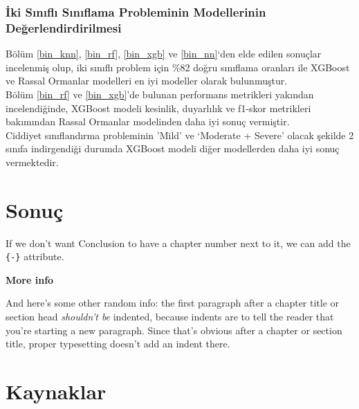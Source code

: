 \documentclass[12pt,twoside]{deuthesis}
\begin{document}
\hypertarget{iki-sux131nux131flux131-sux131nux131flama-probleminin-modellerinin-deux11ferlendirdirilmesi}{%
\subsection{İki Sınıflı Sınıflama Probleminin Modellerinin Değerlendirdirilmesi}\label{iki-sux131nux131flux131-sux131nux131flama-probleminin-modellerinin-deux11ferlendirdirilmesi}}

Bölüm \ref{bin_knn}, \ref{bin_rf}, \ref{bin_xgb} ve \ref{bin_nn}`den elde edilen sonuçlar incelenmiş olup, iki sınıflı problem için \%82 doğru sınıflama oranları ile XGBoost ve Rassal Ormanlar modelleri en iyi modeller olarak bulunmuştur.\\
Bölüm \ref{bin_rf} ve \ref{bin_xgb}'de bulunan performans metrikleri yakından incelendiğinde, XGBoost modeli kesinlik, duyarlılık ve f1-skor metrikleri bakımından Rassal Ormanlar modelinden daha iyi sonuç vermiştir.\\
Ciddiyet sınıflandırma probleminin 'Mild' ve `Moderate + Severe' olacak şekilde 2 sınıfa indirgendiği durumda XGBoost modeli diğer modellerden daha iyi sonuç vermektedir.

\hypertarget{sonuuxe7}{%
\chapter*{Sonuç}\label{sonuuxe7}}

If we don't want Conclusion to have a chapter number next to it, we can add the \texttt{\{-\}} attribute.

\textbf{More info}

And here's some other random info: the first paragraph after a chapter title or section head \emph{shouldn't be} indented, because indents are to tell the reader that you're starting a new paragraph. Since that's obvious after a chapter or section title, proper typesetting doesn't add an indent there.

\hypertarget{kaynaklar}{%
\chapter*{Kaynaklar}\label{kaynaklar}}

\end{document}

